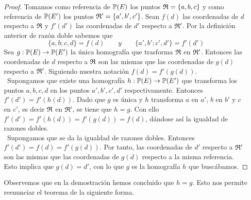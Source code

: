 \begin{proof} Tomamos como referencia de $\mathbb{P}(E)$ los puntos $\mathfrak{R}=\{a,b,c\}$ y como referencia de $\mathbb{P}(E')$ los puntos $\mathfrak{R}'=\{a',b',c'\}$. Sean $f(d)$ las coordenadas de $d$ respecto a $\mathfrak{R}$ y $f'(d')$ las coordenadas de $d'$ respecto a $\mathfrak{R}'$. Por la definición anterior de razón doble sabemos que 
\begin{equation*}
	\{a,b;c,d\}=f(d) \qquad y \qquad \{a',b';c',d'\}=f'(d')
\end{equation*}
Sea $g:\mathbb{P}(E)\rightarrow \mathbb{P}(E')$ la única homografía que trasforma $\mathfrak{R}$ en $\mathfrak{R'}$. Entonces las coordenadas de $d$ respecto a $\mathfrak{R}$ son las mismas que las coordenadas de $g(d)$ respecto a $\mathfrak{R'}$. Siguiendo nuestra notación $f(d)=f'(g(d))$.\\

\bra \ Supongamos que existe una homografía $h:\mathbb{P}(E)\rightarrow \mathbb{P}(E')$ que transforma los puntos $a,b,c,d$ en los puntos $a',b',c',d'$ respectivamente. Entonces $f'(d')=f'(h(d))$. Dado que $g$ es única y $h$ transforma $a$ en $a'$, $b$ en $b'$ y $c$ en $c'$, es decir $\mathfrak{R}$ en $\mathfrak{R'}$, se tiene que $h=g$. Con ello \\
$f'(d')=f'(h(d))=f'(g(d))=f(d)$, dándose así la igualdad de razones dobles.\\

\bla \ Supongamos que se da la igualdad de razones dobles. Entonces $f'(d')=f(d)=f'(g(d))$. Por tanto, las coordenadas de $d'$ respecto a $\mathfrak{R}'$ son las mismas que las coordenadas de $g(d)$ respecto a la misma referencia. Esto implica que $g(d)=d'$, con lo que $g$ es la homografía $h$ que buscábamos.
\end{proof}
Observemos que en la demostración hemos concluido que $h=g$. Esto nos permite reenunciar el teorema de la siguiente forma.\\


